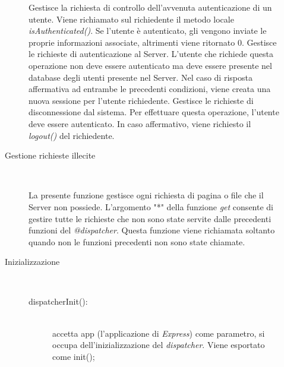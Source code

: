 \begin{description}
\begin{description}
\begin{mldescription}
 Gestisce la richiesta di controllo dell'avvenuta autenticazione di un utente. Viene richiamato sul richiedente il metodo locale \textit{isAuthenticated()}. Se l'utente è autenticato, gli vengono inviate le proprie informazioni associate, altrimenti viene ritornato 0.
 Gestisce le richieste di autenticazione al Server. L'utente che richiede questa operazione non deve essere autenticato ma deve essere presente nel database degli utenti presente nel Server. Nel caso di risposta affermativa ad entrambe le precedenti condizioni, viene creata una nuova sessione per l'utente richiedente.
 Gestisce le richieste di disconnessione dal sistema. Per effettuare questa operazione, l'utente deve essere autenticato. In caso affermativo, viene richiesto il \textit{logout()} del richiedente.
 \end{mldescription}

\item[Gestione richieste illecite] \hfill \\
 \begin{mldescription}
 La presente funzione gestisce ogni richiesta di pagina o file che il Server non possiede. L'argomento "*" della funzione \textit{get} consente di gestire tutte le richieste che non sono state servite dalle precedenti funzioni del \textit{@dispatcher}. Questa funzione viene richiamata soltanto quando non le funzioni precedenti non sono state chiamate.
 \end{mldescription}

\item[Inizializzazione] \hfill \\
 \begin{description}
  \item[dispatcherInit():] \hfill \\ 
  accetta app (l'applicazione di \textit{Express}) come parametro, si occupa dell'inizializzazione del \textit{dispatcher}. Viene esportato come init();
 \end{description}
\end{description}
\end{description}


